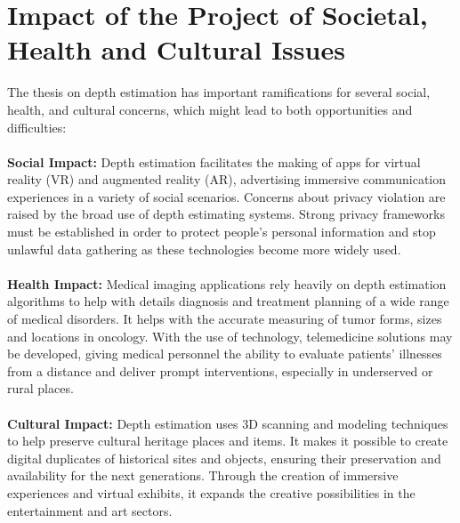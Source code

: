 \documentclass[a4paper,12pt,oneside]{book}
\begin{document}
\section{Impact of the Project of Societal, Health and Cultural Issues}
The thesis on depth estimation has important ramifications for several social, health, and cultural concerns, which might lead to both opportunities and difficulties:\\\\
\textbf{Social Impact:}
Depth estimation facilitates the making of apps for virtual reality (VR) and augmented reality (AR), advertising immersive communication experiences in a variety of social scenarios. Concerns about privacy violation are raised by the broad use of depth estimating systems. Strong privacy frameworks must be established in order to protect people's personal information and stop unlawful data gathering as these technologies become more widely used.\\\\
\textbf{Health Impact:}
Medical imaging applications rely heavily on depth estimation algorithms to help with details diagnosis and treatment planning of a wide range of medical disorders. It helps with the accurate measuring of tumor forms, sizes and locations in oncology.
With the use of technology, telemedicine solutions may be developed, giving medical personnel the ability to evaluate patients' illnesses from a distance and deliver prompt interventions, especially in underserved or rural places.\\\\
\textbf{Cultural Impact:}
Depth estimation uses 3D scanning and modeling techniques to help preserve cultural heritage places and items. It makes it possible to create digital duplicates of historical sites and objects, ensuring their preservation and availability for the next generations.
Through the creation of immersive experiences and virtual exhibits, it expands the creative possibilities in the entertainment and art sectors.
\end{document}
